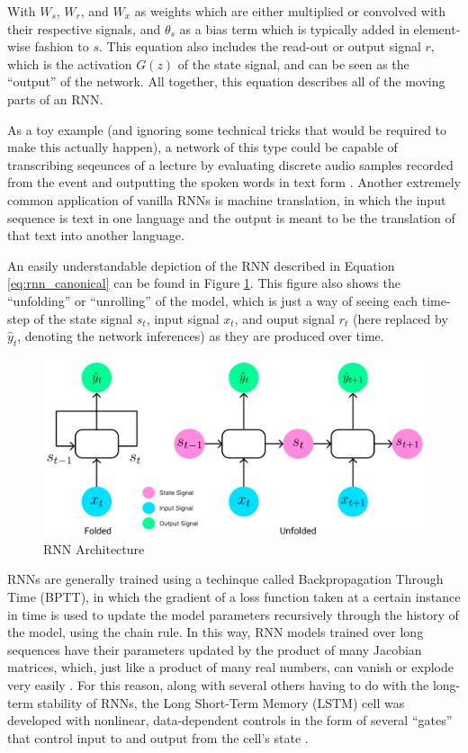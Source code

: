 \documentclass{scrartcl}
\begin{document}
With $W_s$, $W_r$, and $W_x$ as weights which are either multiplied or
convolved with their respective signals, and $\theta_s$ as a bias term
which is typically added in element-wise fashion to $s$. This equation
also includes the read-out or output signal $r$, which is the activation
$G(z)$ of the state signal, and can be seen as the ``output'' of the network.
All together, this equation describes all of the moving parts of an RNN.

As a toy example (and ignoring some technical tricks that would be required to
make this actually happen), a network of this type could be capable of
transcribing seqeunces of a lecture by evaluating discrete audio samples
recorded from the event and outputting the spoken words in text form
\cite{rnn_and_lstm_fundamentals}. Another extremely common application of
vanilla RNNs is machine translation, in which the input sequence is text in one
language and the output is meant to be the translation of that text into
another language.

An easily understandable depiction of the RNN described in Equation
\ref{eq:rnn_canonical} can be found in Figure \ref{fig:rnn_arch}. This figure
also shows the ``unfolding'' or ``unrolling'' of the model, which is just a way
of seeing each time-step of the state signal $s_t$, input signal
$x_t$, and ouput signal $r_t$ (here replaced by $\hat{y}_t$,
denoting the network inferences) as they are produced over time.

\begin{figure}[H]
	\begin{center}
		\includegraphics[width=1\textwidth]{figures/rnn_arch.png}
	\end{center}
	\caption{RNN Architecture}
	\label{fig:rnn_arch}
\end{figure}

RNNs are generally trained using a techinque called Backpropagation Through
Time (BPTT), in which the gradient of a loss function taken at a certain
instance in time is used to update the model parameters recursively through the
history of the model, using the chain rule. In this way, RNN models trained
over long sequences have their parameters updated by the product of many
Jacobian matrices, which, just like a product of many real numbers, can vanish
or explode very easily \cite{rnn_training_challenges}. For this reason, along
with several others having to do with the long-term stability of RNNs, the Long
Short-Term Memory (LSTM) cell was developed with nonlinear, data-dependent
controls in the form of several ``gates'' that control input to and output from 
the cell's state \cite{rnn_and_lstm_fundamentals}.
\end{document}
